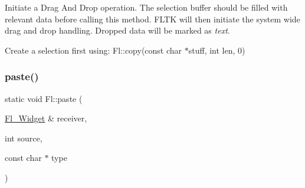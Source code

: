 Initiate a Drag And Drop operation. The selection buffer should be filled with relevant data before calling this method. F\+L\+TK will then initiate the system wide drag and drop handling. Dropped data will be marked as {\itshape text}.

Create a selection first using\+: Fl\+::copy(const char $\ast$stuff, int len, 0) \mbox{\label{group__fl__clipboard_ga2d046c74be020156dd5a71888f5a9452}} 
\subsubsection{\texorpdfstring{paste()}{paste()}\hspace{0.1cm}{\footnotesize\ttfamily [1/3]}}
{\footnotesize\ttfamily static void Fl\+::paste (\begin{DoxyParamCaption}\item[{\hyperlink{class_fl___widget}{Fl\+\_\+\+Widget} \&}]{receiver,  }\item[{int}]{source,  }\item[{const char $\ast$}]{type }\end{DoxyParamCaption})\hspace{0.3cm}{\ttfamily [static]}}


